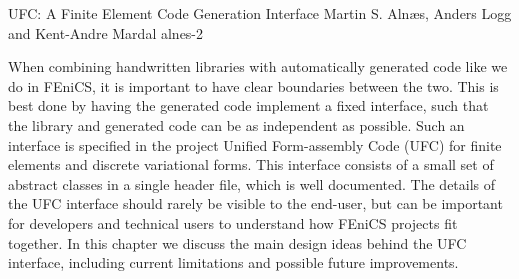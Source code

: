               {UFC: A Finite Element Code Generation Interface}
              {Martin S. Aln\ae{}s, Anders Logg and Kent-Andre Mardal}
              {alnes-2}

When combining handwritten libraries with automatically generated
code like we do in FEniCS, it is important to have clear boundaries
between the two.  This is best done by having the generated code
implement a fixed interface, such that the library and generated code
can be as independent as possible.  Such an interface is specified in
the project Unified Form-assembly Code (UFC) for finite elements and
discrete variational forms. This interface consists of a small set of
abstract classes in a single header file, which is well documented.
The details of the UFC interface should rarely be visible to the
end-user, but can be important for developers and technical users to
understand how FEniCS projects fit together. In this chapter we
discuss the main design ideas behind the UFC interface, including
current limitations and possible future improvements.
